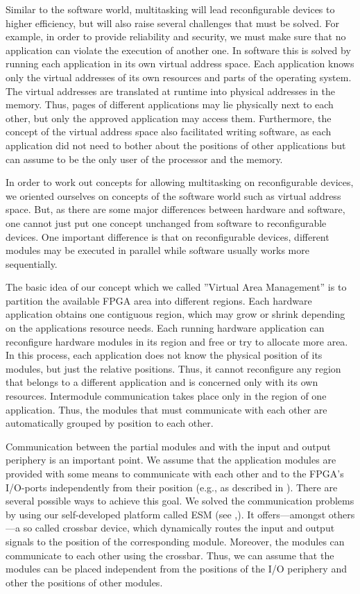 \documentclass[10pt,journal]{IEEEtran}
\begin{document}
Similar to the software world, multitasking will lead reconfigurable
devices to higher efficiency, but will also raise several challenges
that must be solved. For example, in order to provide reliability and
security, we must make sure that no application can violate the
execution of another one. In software this is solved by running each
application in its own virtual address space. Each application knows
only the virtual addresses of its own resources and parts of the
operating system. The virtual addresses are translated at runtime into
physical addresses in the memory. Thus, pages of different
applications may lie physically next to each other, but only the
approved application may access them. Furthermore, the concept of the
virtual address space also facilitated writing software, as each
application did not need to bother about the positions of other
applications but can assume to be the only user of the processor and
the memory.

In order to work out concepts for allowing multitasking on
reconfigurable devices, we oriented ourselves on concepts of the
software world such as virtual address space. But, as there are some
major differences between hardware and software, one cannot just put
one concept unchanged from software to reconfigurable devices. One
important difference is that on reconfigurable devices, different
modules may be executed in parallel while software usually works more
sequentially.

The basic idea of our concept which we called ''Virtual Area
Management'' is to partition the available FPGA area into different
regions. Each hardware application obtains one contiguous region,
which may grow or shrink depending on the applications resource
needs. Each running hardware application can reconfigure hardware
modules in its region and free or try to allocate more area. In this
process, each application does not know the physical position of its
modules, but just the relative positions. Thus, it cannot reconfigure
any region that belongs to a different application and is concerned
only with its own resources. Intermodule communication takes place
only in the region of one application. Thus, the modules that must
communicate with each other are automatically grouped by position to
each other.

Communication between the partial modules and with the input and
output periphery is an important point. We assume that the application
modules are provided with some means to communicate with each other
and to the FPGA's I/O-ports independently from their position (e.g.,
as described in \cite{koch_fccm}). 
There are several possible ways to achieve this
goal. We solved the communication problems by using our self-developed
platform called ESM (see
\cite{AGMTFV_ESM_2007},\cite{bobda_erlangen_2005}). It 
offers---amongst others---a
so called crossbar device, which dynamically routes the
input and output signals to the position of the corresponding
module. 
Moreover, the modules can
communicate to each other using the crossbar.
Thus, we can assume that the
modules can be placed independent from the positions
of the I/O periphery and other the positions of other modules. 
\end{document}
